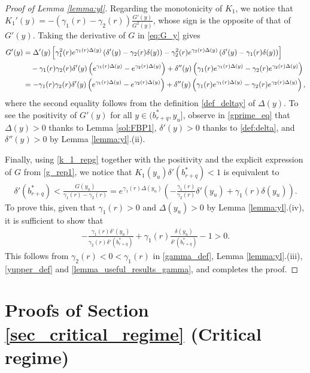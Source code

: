 \documentclass[11pt]{article} %
\numberwithin{komcounter}{section}
\numberwithin{equation}{section}
\numberwithin{theorem}{section}
\begin{document}
\begin{proof}[Proof of Lemma \ref{lemma:yl}]
Regarding the monotonicity of $K_1$, we notice that $K_1'(y) = - (\gamma_1(r)-\gamma_2(r)) \frac{G'(y)}{G^2(y)}$, whose sign is the opposite of that of $G'(y)$. Taking the derivative of $G$ in \eqref{eq:G_y} gives
\begin{align} \label{gprime_eq}
G'(y)
&= \Delta'(y) \left[ \gamma_1^2(r)e^{\gamma_1(r)\Delta(y)}\left( \delta'(y) - \gamma_2(r) \delta(y) \right)
- \gamma_2^2(r)e^{\gamma_2(r)\Delta(y)}\left( \delta'(y) - \gamma_1(r)\delta(y) \right)
\right] \notag\\
&\quad -\gamma_1(r)\gamma_2(r) \delta'(y)\left(e^{\gamma_1(r)\Delta(y) } - e^{\gamma_2(r)\Delta(y)} \right)
+ \delta''(y)\left(\gamma_1(r)e^{\gamma_1(r)\Delta(y) } - \gamma_2(r)e^{\gamma_2(r)\Delta(y)} \right) \notag\\
&= -\gamma_1(r)\gamma_2(r) \delta'(y)\left(e^{\gamma_1(r)\Delta(y) } - e^{\gamma_2(r)\Delta(y)} \right)
+ \delta''(y)\left(\gamma_1(r)e^{\gamma_1(r)\Delta(y) } - \gamma_2(r)e^{\gamma_2(r)\Delta(y)} \right),
\end{align}
where the second equality follows from the definition \eqref{def_deltay} of $\Delta(y)$. 
To see the positivity of $G'(y)$ for all $y \in (b^*_{r+q}, y_u]$, observe in \eqref{gprime_eq} that $\Delta(y) > 0$ thanks to Lemma \ref{sol:FBP1}, $\delta'(y) > 0$ thanks to \eqref{def:delta}, and $\delta''(y) > 0$ by Lemma \ref{lemma:yl}.(ii). 

Finally, using \eqref{k_1_repg} together with the positivity and the explicit expression of $G$ from \eqref{g_rep1}, we notice that $K_1(y_u)\delta'(b^*_{r+q})<1$ is equivalent to 
\begin{align*}
\delta'(b^*_{r+q}) < \frac{G(y_u)}{\gamma_1(r)-\gamma_2(r)} = e^{\gamma_1(r)\Delta(y_u)} \left(-\frac{\gamma_1(r)}{\gamma_2(r)}\delta'(y_u)+\gamma_1(r)\delta(y_u)\right). 
\end{align*}
To prove this, given that $\gamma_1(r)>0$ and $\Delta(y_u) > 0$ by Lemma \ref{lemma:yl}.(iv), it is sufficient to show that
\begin{align*}
- \frac{\gamma_1(r) \delta'(y_u)}{\gamma_2(r) \delta'(b^*_{r+q})} + \gamma_1(r) \frac{\delta(y_u)}{\delta'(b^*_{r+q})} - 1 > 0.
\end{align*}
This follows from $\gamma_2(r)<0< \gamma_1(r)$ in \eqref{gamma_def}, Lemma \ref{lemma:yl}.(iii), \eqref{yupper_def} and \eqref{lemma_useful_results_gamma}, 
and completes the proof.
\end{proof}



\section{Proofs of Section \ref{sec_critical_regime} (Critical regime)}
\label{App_critical}
\end{document}
